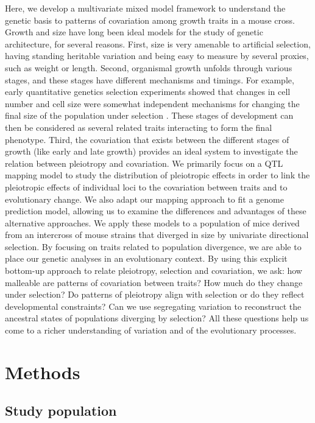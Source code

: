 \begin{refsection}
Here, we develop a multivariate mixed model framework to understand the
genetic basis to patterns of covariation among growth traits in a mouse cross.
Growth and size have long been ideal models for the study of genetic
architecture, for several reasons. First, size is very amenable to artificial
selection, having standing heritable variation and being easy to measure by
several proxies, such as weight or length. Second, organismal growth unfolds
through various stages, and these stages have different mechanisms and
timings. For example, early quantitative genetics selection experiments showed
that changes in cell number and cell size were somewhat independent mechanisms
for changing the final size of the population under selection
\parencite{Falconer1978-kq,Cheverud1983-fq,Leamy1984-df,Riska1984-ml}. These
stages of development can then be considered as several related traits
interacting to form the final phenotype. Third, the  covariation that exists
between the different stages of growth (like early and late growth) provides
an ideal system to investigate the relation between pleiotropy and
covariation. We primarily focus on a QTL mapping model to study the
distribution of pleiotropic effects in order to link the pleiotropic effects
of individual loci to the covariation between traits and to evolutionary
change. We also adapt our mapping approach to fit a genome prediction model,
allowing us to examine the differences and advantages of these alternative
approaches. We apply these models to a population of mice derived from an
intercross of mouse strains that diverged in size by univariate directional
selection. By focusing on traits related to population divergence, we are able
to place our genetic analyses in an evolutionary context. By using this
explicit bottom-up approach to relate pleiotropy, selection and covariation,
we ask: how malleable are patterns of covariation between traits? How much do
they change under selection? Do patterns of pleiotropy align with selection or
do they reflect developmental constraints? Can we use segregating variation to
reconstruct the ancestral states of populations diverging by selection? All
these questions help us come to a richer understanding of variation and of the
evolutionary processes.


\section{Methods}

\subsection{Study population}


\end{refsection}
